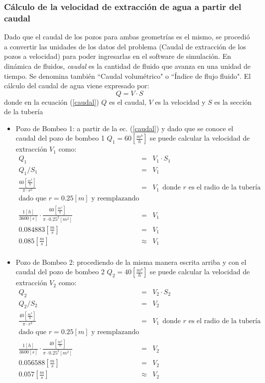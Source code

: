 \documentclass[10pt,a4paper,final]{article}
\begin{document}
\subsubsection{Cálculo de la velocidad de extracción de agua a partir del caudal}
\label{subseccion_transformacion_caudal}
Dado que el caudal de los pozos para ambas geometrías es el mismo, se procedió a convertir las unidades de los datos del problema (Caudal de extracción de los pozos a velocidad) para poder ingresarlas en el software de simulación.
En dinámica de fluidos, \emph{caudal} es la cantidad de fluido que avanza en una unidad de tiempo. Se denomina también ``Caudal volumétrico" o ``Índice de flujo fluido". El cálculo del caudal de agua viene expresado por:
\begin{equation}
Q=V \cdot S
\label{caudal}
\end{equation}
donde en la ecuación (\ref{caudal}) $Q$ es el caudal, $V$ es la velocidad y $S$ es la sección de la tubería
%
\begin{itemize}
\item Pozo de Bombeo 1: a partir de la ec. (\ref{caudal}) y dado que se conoce el caudal del pozo de bombeo 1 $Q_1=60 \left[\frac{m³}{h} \right]$ se puede calcular la velocidad de extracción $V_1$ como:\\
\begin{eqnarray*}
Q_1&=&V_1 \cdot S_1 \\
Q_1/S_1&=&V_1 \\
\frac{60 \left[\frac{m^3}{h}\right]}{\pi \cdot r^2} &=&V_1~~\textrm{donde $r$ es el radio de la tubería}\\
\mbox {dado que $r=0.25 \left[m\right]$ y reemplazando}\\
\frac{1 \left[h\right]}{3600 \left[s\right]}\cdot\frac{60 \left[\frac{m^3}{h}\right]}{\pi \cdot 0.25^2 [m^2]}&=&V_1 \\
0.084883 \left[\frac{m}{s}\right]& = & V_1\\
0.085 \left[\frac{m}{s}\right]&\approx& V_1\\
\end{eqnarray*}
\item Pozo de Bombeo 2: procediendo de la misma manera escrita arriba y con el caudal del pozo de bombeo 2 $Q_2=40 \left[\frac{m³}{h} \right]$ se puede calcular la velocidad de extracción $V_2$ como:\\
\begin{eqnarray*}
Q_2&=&V_2 \cdot S_2 \\
Q_2/S_2&=&V_2 \\
\frac{40 \left[\frac{m^3}{h}\right]}{\pi \cdot r^2} &=&V_1~~\textrm{donde $r$ es el radio de la tubería}\\
\mbox {dado que $r=0.25 \left[m\right]$ y reemplazando}\\
\frac{1 \left[h\right]}{3600 \left[s\right]}\cdot\frac{40 \left[\frac{m^3}{h}\right]}{\pi \cdot 0.25^2 [m^2]}&=&V_2 \\
0.056588 \left[\frac{m}{s}\right]& = & V_2\\
0.057 \left[\frac{m}{s}\right]&\approx& V_2\\
\end{eqnarray*}
\end{itemize}
\end{document}
